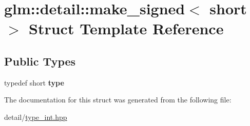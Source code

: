 \hypertarget{structglm_1_1detail_1_1make__signed_3_01short_01_4}{\section{glm\-:\-:detail\-:\-:make\-\_\-signed$<$ short $>$ Struct Template Reference}
\label{structglm_1_1detail_1_1make__signed_3_01short_01_4}
}
\subsection*{Public Types}
\begin{DoxyCompactItemize}
\item 
\hypertarget{structglm_1_1detail_1_1make__signed_3_01short_01_4_a9488d8ffbd34998675456fa6d1143989}{typedef short {\bfseries type}}\label{structglm_1_1detail_1_1make__signed_3_01short_01_4_a9488d8ffbd34998675456fa6d1143989}

\end{DoxyCompactItemize}


The documentation for this struct was generated from the following file\-:\begin{DoxyCompactItemize}
\item 
detail/\hyperlink{type__int_8hpp}{type\-\_\-int.\-hpp}\end{DoxyCompactItemize}
